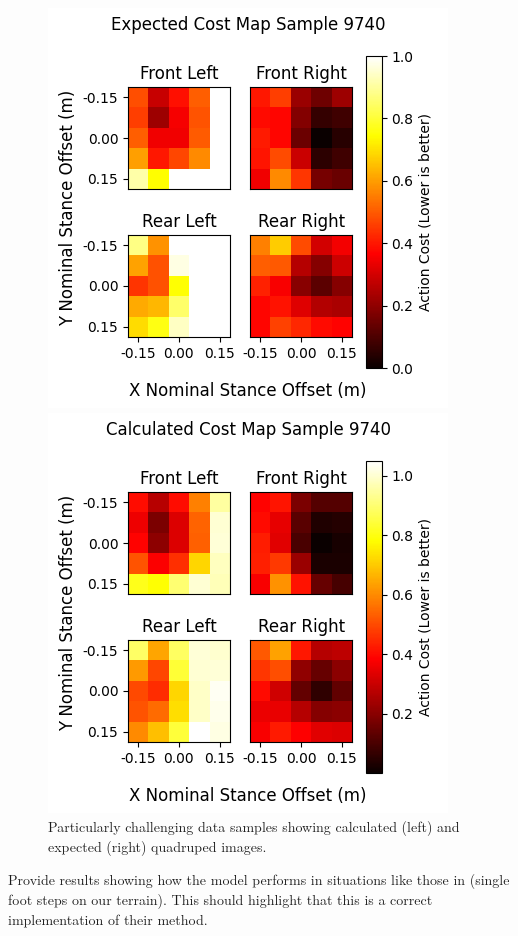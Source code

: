 \begin{figure}[H]
  \centering
  \begin{minipage}[T]{0.45\textwidth}
    \centering
    \includegraphics[width=\textwidth]{images/data/training/challenging-expected.png}
  \end{minipage}
  \hfill
  \begin{minipage}[T]{0.45\textwidth}
    \centering
    \includegraphics[width=\textwidth]{images/data/training/challenging-calculated.png}
  \end{minipage}
  \hfill

  \caption{Particularly challenging data samples showing calculated (left) and
  expected (right) quadruped images.}
  \label{fig:data-cn-challenging-comparison}
\end{figure}

\begin{todo}
  Provide results showing how the model performs in situations like
  those   in \cite{bratta_contactnet_2024} (single foot steps on our
  terrain).   This should highlight that this is a correct
  implementation of their method.
\end{todo}
